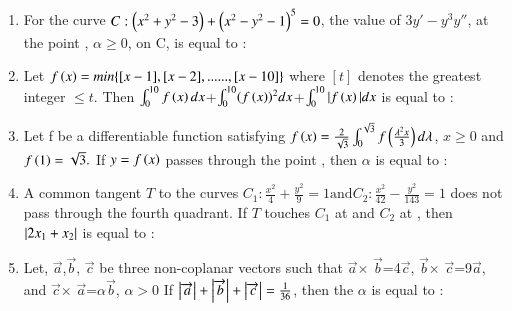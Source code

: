 \documentclass[journal]{IEEEtran}
\begin{document}
\begin{enumerate}
    \item For the curve $C: \left(x^2+y^2-3\right)+\left(x^2-y^2-1\right)^5=0$, the value of $3y'-y^3y''$, at the point \brak{\alpha,\alpha
    }, $\alpha \geq 0$, on C, is equal to  :
  \hfill{}
    \item Let $f\left(x\right)=min\{[x-1],[x-2],......,[x-10]\}$ where $[t]$ denotes the greatest integer $\leq t$. Then $\int_{0}^{10}f\left(x\right)dx$+$\int_{0}^{10}(f\left(x\right))^2dx$+$\int_{0}^{10}|f\left(x\right)|dx$ is equal to :
\hfill{}
    \item Let f be a differentiable function satisfying $f\left(x\right)=\frac{2}{\sqrt{3}}\int_{0}^{\sqrt{3}}  f\left(\frac{\lambda^2x}{3}\right)d\lambda$, $x\geq0$ and $f\left(1\right)=\sqrt{3}.$ If $y=f\left(x\right)$ passes through the point , then $\alpha$ is equal to :
   \hfill{}
    \item A common tangent $T$ to the curves $C_1 : \frac{x^2}{4}+\frac{y^2}{9}=1 \text{and} C_2:\frac{x^2}{42}-\frac{y^2}{143}=1 $ does not pass through the fourth quadrant. If $T$ touches $C_1$ at  and $C_2$ at , then $\left\vert2x_1+x_2\right\vert$ is equal to :
 \hfill{}
    \item Let, $\overrightarrow{a}$,$\overrightarrow{b}$, $\overrightarrow{c}$ be three non-coplanar vectors such that  $\overrightarrow{a}$$\times$ $\overrightarrow{b}$=4$\overrightarrow{c}$,  $\overrightarrow{b}$$\times$ $\overrightarrow{c}$=9$\overrightarrow{a}$, and  $\overrightarrow{c}$$\times$ $\overrightarrow{a}$=$\alpha$$\overrightarrow{b}$, $\alpha >0$
If $\left\vert\overrightarrow{a}\right\vert+\left\vert\overrightarrow{b}\right\vert+\left\vert\overrightarrow{c}\right\vert=\frac{1}{36}$, then the $\alpha$ is equal to :
\hfill{}

 \end{enumerate}
\end{document}
